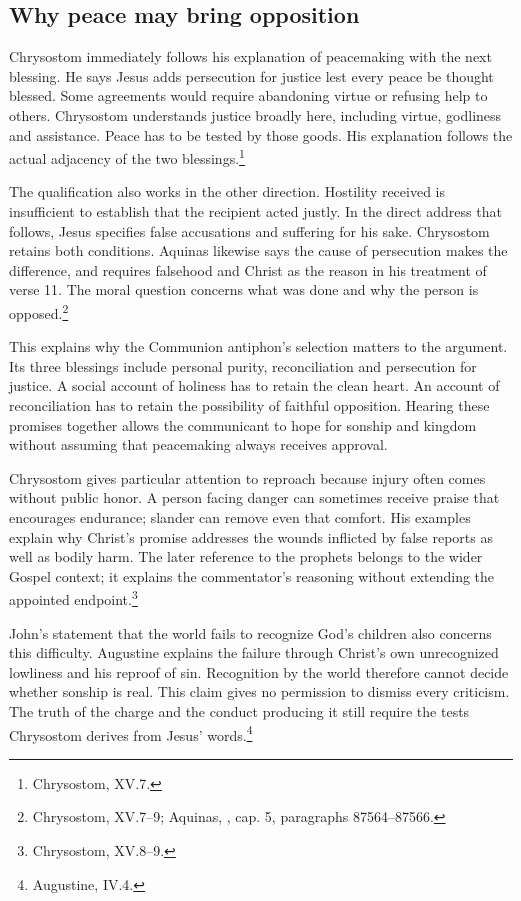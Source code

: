 \subsection{Why peace may bring opposition}
Chrysostom immediately follows his explanation of peacemaking with the next blessing. He says Jesus adds persecution for justice lest every peace be thought blessed. Some agreements would require abandoning virtue or refusing help to others. Chrysostom understands justice broadly here, including virtue, godliness and assistance. Peace has to be tested by those goods. His explanation follows the actual adjacency of the two blessings.\footnote{Chrysostom,  XV.7.}

The qualification also works in the other direction. Hostility received is insufficient to establish that the recipient acted justly. In the direct address that follows, Jesus specifies false accusations and suffering for his sake. Chrysostom retains both conditions. Aquinas likewise says the cause of persecution makes the difference, and requires falsehood and Christ as the reason in his treatment of verse 11. The moral question concerns what was done and why the person is opposed.\footnote{Chrysostom,  XV.7--9; Aquinas, , cap. 5, paragraphs 87564--87566.}

This explains why the Communion antiphon's selection matters to the argument. Its three blessings include personal purity, reconciliation and persecution for justice. A social account of holiness has to retain the clean heart. An account of reconciliation has to retain the possibility of faithful opposition. Hearing these promises together allows the communicant to hope for sonship and kingdom without assuming that peacemaking always receives approval.

Chrysostom gives particular attention to reproach because injury often comes without public honor. A person facing danger can sometimes receive praise that encourages endurance; slander can remove even that comfort. His examples explain why Christ's promise addresses the wounds inflicted by false reports as well as bodily harm. The later reference to the prophets belongs to the wider Gospel context; it explains the commentator's reasoning without extending the appointed endpoint.\footnote{Chrysostom,  XV.8--9.}

John's statement that the world fails to recognize God's children also concerns this difficulty. Augustine explains the failure through Christ's own unrecognized lowliness and his reproof of sin. Recognition by the world therefore cannot decide whether sonship is real. This claim gives no permission to dismiss every criticism. The truth of the charge and the conduct producing it still require the tests Chrysostom derives from Jesus' words.\footnote{Augustine,  IV.4.}


